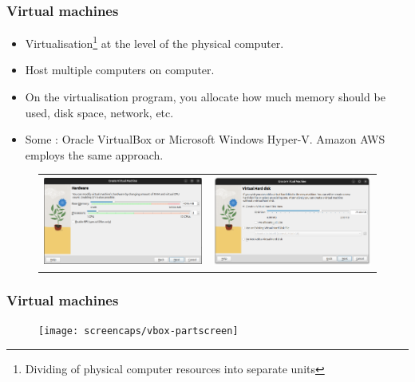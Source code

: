 \documentclass[11pt,aspectratio=43,ignorenonframetext,t]{beamer}
\begin{document}
\begin{frame}

\frametitle{Virtual machines}

\begin{itemize}
  \item Virtualisation\footnote{Dividing of physical computer resources into separate units} at the level of the physical computer.
  \item Host multiple {} computers on {} computer.
  \item On the virtualisation program, you allocate how much memory should be used, disk space, network, etc.
  \item Some {}:  Oracle VirtualBox or Microsoft Windows Hyper-V.  Amazon AWS employs the same approach.
\end{itemize}

\begin{figure}
  \centering
  \begin{tabular}{cc}
    \includegraphics[width=5.25cm]{screencaps/vbox-memory} &
    \includegraphics[width=5.25cm]{screencaps/vbox-hdd} \\
  \end{tabular}
\end{figure}

\end{frame}


\begin{frame}

\frametitle{Virtual machines}

\begin{figure}
  \centering
  \texttt{[image: screencaps/vbox-partscreen]} \\
\end{figure}

\end{frame}
\end{document}
